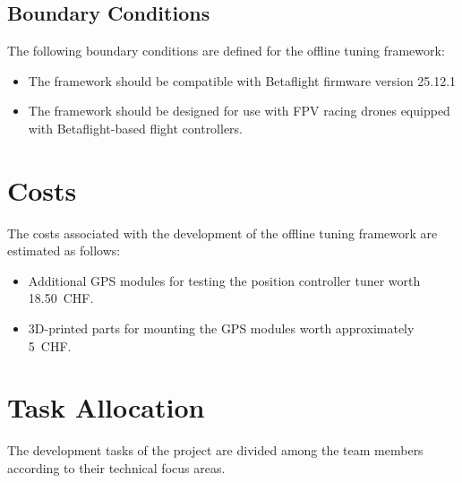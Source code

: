 \documentclass[a4paper,11pt,bibliography=totoc,listof=totoc]{scrreprt}
\begin{document}
\subsection{Boundary Conditions}
The following boundary conditions are defined for the offline tuning framework:
\begin{itemize}
    \item The framework should be compatible with Betaflight firmware version 25.12.1
    \item The framework should be designed for use with FPV racing drones equipped with Betaflight-based flight controllers.
\end{itemize}

\section{Costs}
The costs associated with the development of the offline tuning framework are estimated as follows:
\begin{itemize}
    \item Additional GPS modules for testing the position controller tuner worth 18.50~CHF.
    \item 3D-printed parts for mounting the GPS modules worth approximately 5~CHF.
\end{itemize}

\section{Task Allocation}

The development tasks of the project are divided among the team members
according to their technical focus areas.
\end{document}
